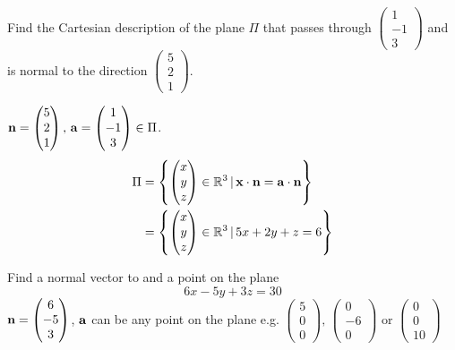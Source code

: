 \documentclass[10pt, a4paper]{article}
\begin{document}
\begin{example}
    Find the Cartesian description of the plane $\Pi$ that passes through $\begin{pmatrix}
        1 \\ -1 \\ 3
    \end{pmatrix}$ and is normal to the direction $\begin{pmatrix}
        5 \\ 2 \\ 1
    \end{pmatrix}$.

    $\mathbf{n} = \begin{pmatrix}
        5 \\ 2 \\ 1
    \end{pmatrix},\, \mathbf{a} = \begin{pmatrix}
        1 \\ -1 \\ 3
    \end{pmatrix} \in \Pi$.
    \begin{align*}
    \Pi &= \left\{ \begin{pmatrix}
        x \\ y \\ z
    \end{pmatrix} \in \mathbb{R} ^ 3\,|\, \mathbf{x \cdot n = a \cdot n}\right\} \\
    &=\left\{\begin{pmatrix}
        x \\ y \\ z
    \end{pmatrix} \in \mathbb{R} ^ 3\,|\, 5x + 2y + z = 6\right\}
    \end{align*}
\end{example}

\begin{example}
    Find a normal vector to and a point on the plane
    \[
    6x - 5y + 3z = 30
    \]
    $\mathbf{n} = \begin{pmatrix}
        6 \\ -5 \\ 3
    \end{pmatrix}$, $\mathbf{a}$ can be any point on the plane e.g. $\begin{pmatrix}
        5 \\ 0 \\ 0
    \end{pmatrix},\,\begin{pmatrix}
        0 \\ -6 \\ 0
    \end{pmatrix} \text{ or } \begin{pmatrix}
        0 \\ 0 \\ 10
    \end{pmatrix}$
\end{example}
\end{document}
